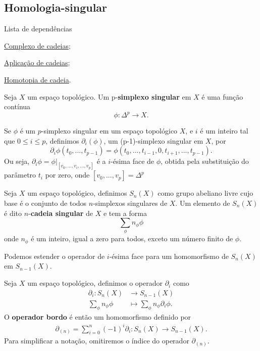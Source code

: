\subsection{Homologia-singular} %
\label{homologia-singular-def}
\begin{titlemize}{Lista de dependências}
	\item \hyperref[complexo-de-cadeias-def]{Complexo de cadeias};\\ 
    \item \hyperref[aplicacao-de-cadeias-def]{Aplicação de cadeias};\\
    \item \hyperref[homotopia-de-cadeias-def]{Homotopia de cadeia}.\\
\end{titlemize}

\begin{defi}
    Seja $X$ um espaço topológico. Um p-\textbf{simplexo singular} em $X$ é uma função contínua 
    \[\phi:\Delta^p\longrightarrow X.\]
\end{defi}

\begin{defi}
    Se $\phi$ é um $p$-simplexo singular em um espaço topológico $X$, e $i$ é um inteiro tal que $0\le i\le p$, definimos $\partial_i (\phi)$, um (p-1)-simplexo singular em $X$, por 
    \[\partial_i \phi(t_0,...,t_{p-1})=\phi(t_0,...,t_{i-1},0,t_{i+1},...,t_{p-1}).\]
    Ou seja, $\partial_i \phi=\phi|_{[v_0,...,\widehat{v_i},...,v_{p}]}$ é a $i$-ésima face de $\phi$, obtida pela substituição do parâmetro $t_i$ por zero, onde $[v_0,...,v_p]=\Delta^p$
\end{defi}

\begin{defi}
    Seja $X$ um espaço topológico, definimos $S_n(X)$ como grupo abeliano livre cujo base é o conjunto de todos $n$-simplexos singulares de $X$. Um elemento de $S_n(X)$ é dito $n$-\textbf{cadeia singular} de $X$ e tem a forma 
    \[\sum_\phi n_\phi \phi\]
    onde $n_\phi$ é um inteiro, igual a zero para todos, exceto um número finito de $\phi$.
\end{defi}

Podemos estender o operador de $i$-ésima face para um homomorfismo de $S_n(X)$ em $S_{n-1} (X)$. 

\begin{defi}
    Seja $X$ um espaço topológico, definimos o operador $\partial_i$ como
    \begin{align*}
        \partial_i: S_n(X)&\longrightarrow S_{n-1}(X)\\
        \sum_\phi n_\phi \phi&\longmapsto \sum_\phi n_\phi \partial_i\phi.
    \end{align*}
    O \textbf{operador bordo} é então um homomorfismo definido por
    \begin{align*}
        \partial_{(n)}=\sum_{i=0}^n (-1)^i \partial_i:S_n(X)\longrightarrow S_{n-1}(X).
    \end{align*}
    Para simplificar a notação, omitiremos o índice do operador $\partial_{(n)}$.
\end{defi}

